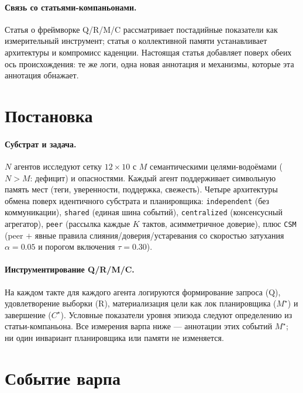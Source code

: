 \documentclass{article}
\newcommand{\method}[1]{\texttt{#1}}
\newcommand{\mstar}{M^{\star}}
\newcommand{\cstar}{C^{\star}}
\begin{document}
\paragraph{Связь со статьями-компаньонами.}
Статья о фреймворке Q/R/M/C рассматривает постадийные показатели как
измерительный инструмент; статья о коллективной памяти устанавливает
архитектуры и компромисс каденции. Настоящая статья добавляет поверх
обеих ось происхождения: те же логи, одна новая аннотация и
механизмы, которые эта аннотация обнажает. %

\section{Постановка}
\label{sec:setting}

\paragraph{Субстрат и задача.} $N$ агентов исследуют сетку
$12\times10$ с $M$ семантическими целями-водоёмами ($N>M$: дефицит) и
опасностями. Каждый агент поддерживает символьную память мест (теги,
уверенности, поддержка, свежесть). Четыре архитектуры обмена поверх
идентичного субстрата и планировщика: \method{independent} (без
коммуникации), \method{shared} (единая шина событий),
\method{centralized} (консенсусный агрегатор), \method{peer}
(рассылка каждые $K$ тактов, асимметричное доверие), плюс
\method{CSM} (peer $+$ явные правила слияния/доверия/устаревания со
скоростью затухания $\alpha{=}0.05$ и порогом включения
$\tau{=}0.30$). %

\paragraph{Инструментирование Q/R/M/C.} На каждом такте для каждого
агента логируются формирование запроса (Q), удовлетворение выборки
(R), материализация цели как лок планировщика ($\mstar$) и завершение
($\cstar$). Условные показатели уровня эпизода следуют определению из
статьи-компаньона. Все измерения варпа ниже --- аннотации этих
событий $\mstar$; ни один инвариант планировщика или памяти не
изменяется.

\section{Событие варпа}
\label{sec:warp-def}
\end{document}
